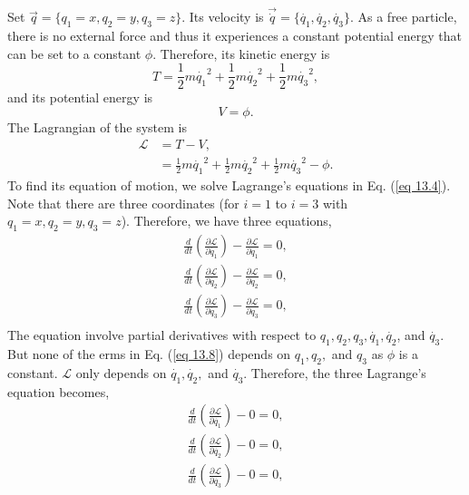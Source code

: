 \documentclass{article}
\begin{document}
Set $\vec{q}= \{ q_1=x, q_2=y, q_3=z \}$. Its velocity is $\vec{\dot{q}}=\{\dot{q_1},\dot{q_2},\dot{q_3} \}$.
As a free particle, there is no external force and thus it experiences a constant potential energy that can be set to a constant $\phi$. 
Therefore, its kinetic energy is
\begin{equation}\label{eq 13.6}
    T=\frac{1}{2}m\dot{q_1}^2+\frac{1}{2}m\dot{q_2}^2+\frac{1}{2}m\dot{q_3}^2,\tag{13.6}
\end{equation}
and its potential energy is
\begin{equation}\label{eq 13.7}
    V=\phi.\tag{13.7}
\end{equation}
The Lagrangian of the system is
\begin{align*}\label{eq 13.8}
    \mathcal{L}&=T-V,\\
    &=\frac{1}{2}m\dot{q_1}^2+\frac{1}{2}m\dot{q_2}^2+\frac{1}{2}m\dot{q_3}^2-\phi.\tag{13.8}
\end{align*}
To find its equation of motion, we solve Lagrange's equations in Eq. (\ref{eq 13.4}). 
Note that there are three coordinates (for $i=1$ to $i=3$ with $q_1=x,q_2=y,q_3=z$).
Therefore, we have three equations,
\begin{align*}\label{eq 13.9}
     \frac{d}{dt}\left(\frac{\partial \mathcal{L}}{\partial \dot{q_1}}\right)
    -\frac{\partial \mathcal{L}}{\partial q_1}=0,\tag{13.9}\\[5pt]
     \frac{d}{dt}\left(\frac{\partial \mathcal{L}}{\partial \dot{q_2}}\right)
    -\frac{\partial \mathcal{L}}{\partial q_2}=0,\tag{13.10}\\[5pt]
     \frac{d}{dt}\left(\frac{\partial \mathcal{L}}{\partial \dot{q_3}}\right)
    -\frac{\partial \mathcal{L}}{\partial q_3}=0,\tag{13.11}\\
\end{align*}
The equation involve partial derivatives with respect to $q_1,q_2,q_3,\dot{q_1},\dot{q_2}$, and $\dot{q_3}$.
But none of the erms in Eq. (\ref{eq 13.8}) depends on $q_1,q_2,$ and $q_3$ as $\phi$ is a constant.
$\mathcal{L}$ only depends on $\dot{q_1},\dot{q_2},$ and $\dot{q_3}$. Therefore, the three Lagrange's equation becomes,
\begin{align*}\label{eq 13.12}
      \frac{d}{dt}\left(\frac{\partial \mathcal{L}}{\partial \dot{q_1}}\right)
    -0=0,\tag{13.12}\\[5pt]
     \frac{d}{dt}\left(\frac{\partial \mathcal{L}}{\partial \dot{q_2}}\right)
    -0=0,\tag{13.13}\\[5pt]
     \frac{d}{dt}\left(\frac{\partial \mathcal{L}}{\partial \dot{q_3}}\right)
    -0=0,\tag{13.14}\\
\end{align*}
\end{document}
